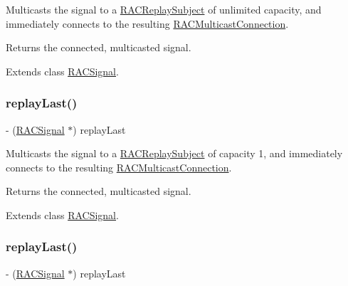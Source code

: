 Multicasts the signal to a \mbox{\hyperlink{interface_r_a_c_replay_subject}{R\+A\+C\+Replay\+Subject}} of unlimited capacity, and immediately connects to the resulting \mbox{\hyperlink{interface_r_a_c_multicast_connection}{R\+A\+C\+Multicast\+Connection}}.

Returns the connected, multicasted signal. 

Extends class \mbox{\hyperlink{interface_r_a_c_signal_a6d7d83297f6b837dd5efc18c38483a94}{R\+A\+C\+Signal}}.

\mbox{\label{category_r_a_c_signal_07_operations_08_a1a660e0db48169a1ea54288b196515b1}} 
\subsubsection{\texorpdfstring{replay\+Last()}{replayLast()}\hspace{0.1cm}{\footnotesize\ttfamily [1/3]}}
{\footnotesize\ttfamily -\/ (\mbox{\hyperlink{interface_r_a_c_signal}{R\+A\+C\+Signal}} $\ast$) replay\+Last \begin{DoxyParamCaption}{ }\end{DoxyParamCaption}}

Multicasts the signal to a \mbox{\hyperlink{interface_r_a_c_replay_subject}{R\+A\+C\+Replay\+Subject}} of capacity 1, and immediately connects to the resulting \mbox{\hyperlink{interface_r_a_c_multicast_connection}{R\+A\+C\+Multicast\+Connection}}.

Returns the connected, multicasted signal. 

Extends class \mbox{\hyperlink{interface_r_a_c_signal_a1a660e0db48169a1ea54288b196515b1}{R\+A\+C\+Signal}}.

\mbox{\label{category_r_a_c_signal_07_operations_08_a1a660e0db48169a1ea54288b196515b1}} 
\subsubsection{\texorpdfstring{replay\+Last()}{replayLast()}\hspace{0.1cm}{\footnotesize\ttfamily [2/3]}}
{\footnotesize\ttfamily -\/ (\mbox{\hyperlink{interface_r_a_c_signal}{R\+A\+C\+Signal}} $\ast$) replay\+Last \begin{DoxyParamCaption}{ }\end{DoxyParamCaption}}

